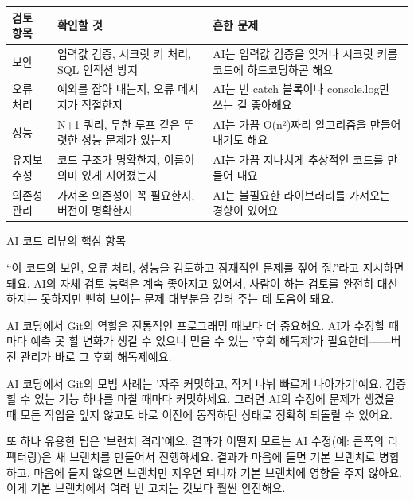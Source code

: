 \begin{center}
\begin{tabularx}{\linewidth}{|X|X|X|}
\hline
\textbf{검토 항목} & \textbf{확인할 것} & \textbf{흔한 문제} \tabularnewline
\hline
보안 & 입력값 검증, 시크릿 키 처리, SQL 인젝션 방지 & AI는 입력값 검증을 잊거나 시크릿 키를 코드에 하드코딩하곤 해요 \tabularnewline
오류 처리 & 예외를 잡아 내는지, 오류 메시지가 적절한지 & AI는 빈 catch 블록이나 console.log만 쓰는 걸 좋아해요 \tabularnewline
성능 & N+1 쿼리, 무한 루프 같은 뚜렷한 성능 문제가 있는지 & AI는 가끔 O(n²)짜리 알고리즘을 만들어 내기도 해요 \tabularnewline
유지보수성 & 코드 구조가 명확한지, 이름이 의미 있게 지어졌는지 & AI는 가끔 지나치게 추상적인 코드를 만들어 내요 \tabularnewline
의존성 관리 & 가져온 의존성이 꼭 필요한지, 버전이 명확한지 & AI는 불필요한 라이브러리를 가져오는 경향이 있어요 \tabularnewline
\hline
\end{tabularx}
\end{center}

\begin{center}\small\color{gray}AI 코드 리뷰의 핵심 항목\end{center}

“이 코드의 보안, 오류 처리, 성능을 검토하고 잠재적인 문제를 짚어 줘.”라고 지시하면 돼요. AI의 자체 검토 능력은 계속 좋아지고 있어서, 사람이 하는 검토를 완전히 대신하지는 못하지만 뻔히 보이는 문제 대부분을 걸러 주는 데 도움이 돼요.


AI 코딩에서 Git의 역할은 전통적인 프로그래밍 때보다 더 중요해요. AI가 수정할 때마다 예측 못 할 변화가 생길 수 있으니 믿을 수 있는 '후회 해독제'가 필요한데——버전 관리가 바로 그 후회 해독제예요.

AI 코딩에서 Git의 모범 사례는 '자주 커밋하고, 작게 나눠 빠르게 나아가기'예요. 검증할 수 있는 기능 하나를 마칠 때마다 커밋하세요. 그러면 AI의 수정에 문제가 생겼을 때 모든 작업을 엎지 않고도 바로 이전에 동작하던 상태로 정확히 되돌릴 수 있어요.

또 하나 유용한 팁은 '브랜치 격리'예요. 결과가 어떨지 모르는 AI 수정(예: 큰폭의 리팩터링)은 새 브랜치를 만들어서 진행하세요. 결과가 마음에 들면 기본 브랜치로 병합하고, 마음에 들지 않으면 브랜치만 지우면 되니까 기본 브랜치에 영향을 주지 않아요. 이게 기본 브랜치에서 여러 번 고치는 것보다 훨씬 안전해요.


